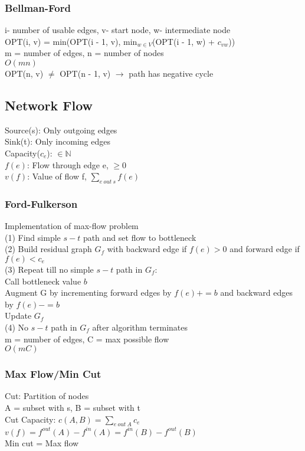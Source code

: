 \documentclass{article}
\begin{document}
\begin{multicols*}{2}
        \subsubsection*{Bellman-Ford}
        i- number of usable edges, v- start node, w- intermediate node\\
        OPT(i, v) = min(OPT(i - 1, v), min$_{w\in V}$(OPT(i - 1, w) + $c_{vw}$))\\
        m = number of edges, n = number of nodes\\
        $O(mn)$\\
        OPT(n, v) $\neq$ OPT(n - 1, v) $\to$ path has negative cycle
        \subsection*{Network Flow}
        Source(s): Only outgoing edges\\
        Sink(t): Only incoming edges\\
        Capacity($c_e$): $\in \mathbb{N}$\\
        $f(e)$: Flow through edge e, $\geq$0\\
        $v(f)$: Value of flow f, $\sum_{e\ out\ s} f(e)$
        \subsubsection*{Ford-Fulkerson}
        Implementation of max-flow problem\\
        (1) Find simple $s - t$ path and set flow to bottleneck\\
        (2) Build residual graph $G_f$ with backward edge if $f(e) > 0$ and forward edge if
        $f(e) < c_e$\\
        (3) Repeat till no simple $s - t$ path in $G_f$:\\
        Call bottleneck value $b$\\
        Augment G by incrementing forward edges by $f(e) += b$ and backward edges by $f(e) -= b$\\
        Update $G_f$\\
        (4) No $s - t$ path in $G_f$ after algorithm terminates\\
        m = number of edges, C = max possible flow\\
        $O(mC)$\\
        \subsubsection*{Max Flow/Min Cut}
        Cut: Partition of nodes\\
        A = subset with s, B = subset with t\\
        Cut Capacity: $c(A, B) = \sum_{e\ out\ A} c_e$\\
        $v(f) = f^{out}(A) - f^{in}(A) = f^{in}(B) - f^{out}(B)$\\
        Min cut = Max flow
    \end{multicols*}
\end{document}
